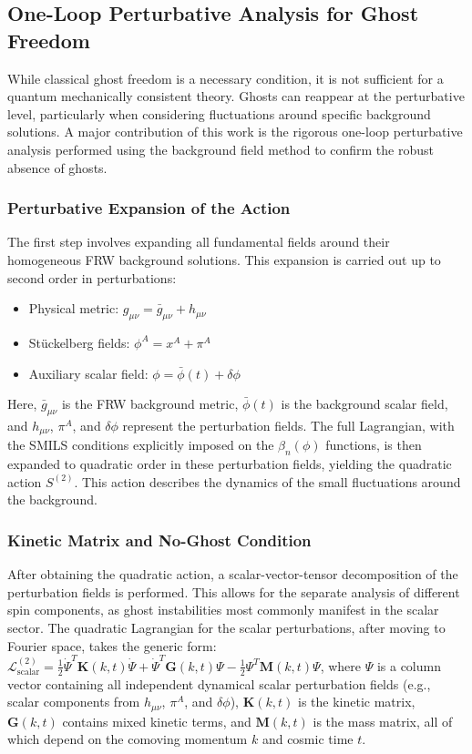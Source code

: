 \documentclass[twocolumn]{aastex631}
\begin{document}
\subsection{One-Loop Perturbative Analysis for Ghost Freedom}
While classical ghost freedom is a necessary condition, it is not sufficient for a quantum mechanically consistent theory. Ghosts can reappear at the perturbative level, particularly when considering fluctuations around specific background solutions. A major contribution of this work is the rigorous one-loop perturbative analysis performed using the background field method to confirm the robust absence of ghosts.

\subsubsection{Perturbative Expansion of the Action}
The first step involves expanding all fundamental fields around their homogeneous FRW background solutions. This expansion is carried out up to second order in perturbations:
\begin{itemize}
    \item Physical metric: $g_{\mu\nu} = \bar{g}_{\mu\nu} + h_{\mu\nu}$
    \item Stückelberg fields: $\phi^A = x^A + \pi^A$
    \item Auxiliary scalar field: $\phi = \bar{\phi}(t) + \delta\phi$
\end{itemize}
Here, $\bar{g}_{\mu\nu}$ is the FRW background metric, $\bar{\phi}(t)$ is the background scalar field, and $h_{\mu\nu}$, $\pi^A$, and $\delta\phi$ represent the perturbation fields. The full Lagrangian, with the SMILS conditions explicitly imposed on the $\beta_n(\phi)$ functions, is then expanded to quadratic order in these perturbation fields, yielding the quadratic action $S^{(2)}$. This action describes the dynamics of the small fluctuations around the background.

\subsubsection{Kinetic Matrix and No-Ghost Condition}
After obtaining the quadratic action, a scalar-vector-tensor decomposition of the perturbation fields is performed. This allows for the separate analysis of different spin components, as ghost instabilities most commonly manifest in the scalar sector. The quadratic Lagrangian for the scalar perturbations, after moving to Fourier space, takes the generic form:
$\mathcal{L}^{(2)}_{\text{scalar}} = \frac{1}{2} \dot{\Psi}^T \mathbf{K}(k,t) \dot{\Psi} + \dot{\Psi}^T \mathbf{G}(k,t) \Psi - \frac{1}{2} \Psi^T \mathbf{M}(k,t) \Psi$,
where $\Psi$ is a column vector containing all independent dynamical scalar perturbation fields (e.g., scalar components from $h_{\mu\nu}$, $\pi^A$, and $\delta\phi$), $\mathbf{K}(k,t)$ is the kinetic matrix, $\mathbf{G}(k,t)$ contains mixed kinetic terms, and $\mathbf{M}(k,t)$ is the mass matrix, all of which depend on the comoving momentum $k$ and cosmic time $t$.
\end{document}

